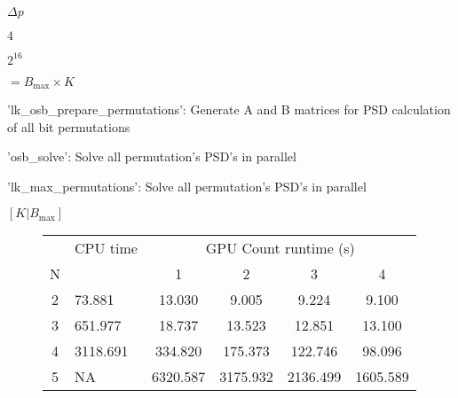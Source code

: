 {{\begin{figure}
\end{figure}%
\lthtmlfigureZ
\lthtmlcheckvsize\clearpage}

{\newpage\clearpage
{}%
$ \Delta p$%
\lthtmlinlinemathZ
\lthtmlcheckvsize\clearpage}

{\newpage\clearpage
{}%
$ 4$%
\lthtmlinlinemathZ
\lthtmlcheckvsize\clearpage}

{\newpage\clearpage
{}%
$ 2^{16}$%
\lthtmlinlinemathZ
\lthtmlcheckvsize\clearpage}

{\newpage\clearpage
{}%
$ =B_{\text{max}}\times K$%
\lthtmlinlinemathZ
\lthtmlcheckvsize\clearpage}

{\newpage\clearpage
{}%
\begin{figure}  
  
\end{figure}%
\lthtmlfigureZ
\lthtmlcheckvsize\clearpage}

{\newpage\clearpage
{}%
\begin{itemize*}
\item{'lk\_osb\_prepare\_permutations': Generate A and B matrices for PSD calculation of all bit permutations}
\item{'osb\_solve': Solve all permutation's PSD's in parallel}
\item{'lk\_max\_permutations': Solve all permutation's PSD's in parallel}
\end{itemize*}%
\lthtmlfigureZ
\lthtmlcheckvsize\clearpage}

{\newpage\clearpage
{}%
$ [K|B_{\text{max}}]$%
\lthtmlinlinemathZ
\lthtmlcheckvsize\clearpage}

{\newpage\clearpage
{}%
\begin{figure}
\centering 
  \begin{tabularx}{0.6\textwidth}{|c|X|c|c|c|c|}
  \hline
  &CPU time&\multicolumn{4}{|c|}{GPU Count runtime (s)}\\
  N&&1&2&3&4\\\hline
  2&73.881&13.030&9.005&9.224&9.100\\
  3&651.977&18.737&13.523&12.851&13.100\\
  4&3118.691&334.820&175.373&122.746&98.096\\
  5&NA&6320.587&3175.932&2136.499&1605.589\\\hline
  \end{tabularx}



\end{figure}}}
